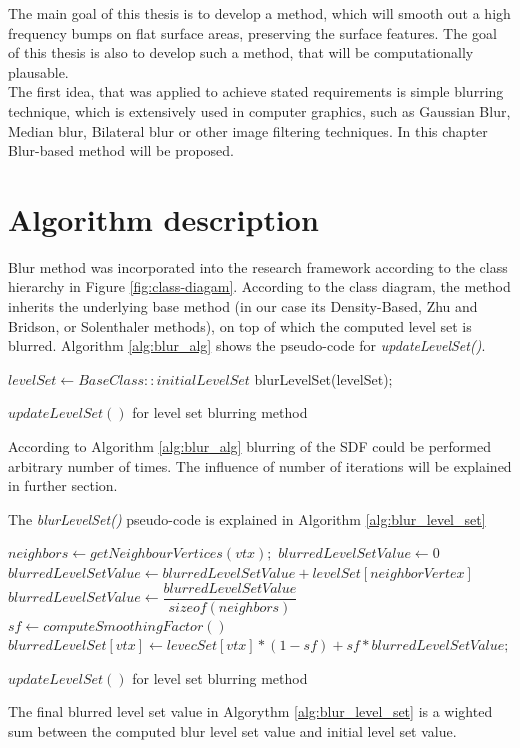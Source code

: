 The main goal of this thesis is to develop a method, which will smooth out a high frequency bumps on flat surface areas, preserving the surface features. The goal of this thesis is also to develop such a method, that will be computationally plausable.\\
The first idea, that was applied to achieve stated requirements is simple blurring technique, which is extensively used in computer graphics, such as Gaussian Blur, Median blur, Bilateral blur or other image filtering techniques. In this chapter Blur-based method will be proposed. 
\section{Algorithm description}
Blur method was incorporated into the research framework according to the class hierarchy in Figure \ref{fig:class-diagam}. According to the class diagram, the method inherits the underlying base method (in our case its Density-Based, Zhu and Bridson, or Solenthaler methods), on top of which the computed level set is blurred.  Algorithm \ref{alg:blur_alg} shows the pseudo-code for \emph{updateLevelSet()}.
\begin{algorithm}[H]
	\scriptsize
	\begin{algorithmic}
		\State $levelSet \gets  BaseClass::initialLevelSet$
			\State blurLevelSet(levelSet);
		\EndFor
	\end{algorithmic}
	\caption{$updateLevelSet()$ for level set blurring method}
	\label{alg:blur_alg}
\end{algorithm}
According to Algorithm \ref{alg:blur_alg} blurring of the SDF could be performed arbitrary number of times. The influence of number of iterations will be explained in further section.

The \emph{blurLevelSet()} pseudo-code is explained in Algorithm \ref{alg:blur_level_set}
\begin{algorithm}[H]
	\scriptsize
	\begin{algorithmic}
		\ForAll{$vtx \in MC\_CellDomain$}
			\State $neighbors \gets getNeighbourVertices(vtx);$
			\State $blurredLevelSetValue \gets 0$
			\ForAll{$nbVtx \in neighbors$}
				\State $blurredLevelSetValue\gets blurredLevelSetValue + levelSet[neighborVertex]$
			\EndFor
			\State $blurredLevelSetValue\gets\dfrac{blurredLevelSetValue}{sizeof(neighbors)}$
			\State $sf\gets computeSmoothingFactor()$
			\State $blurredLevelSet[vtx]\gets levecSet[vtx] * (1 - sf) + sf * blurredLevelSetValue;$
		\EndFor
	\end{algorithmic}
	\caption{$updateLevelSet()$ for level set blurring method}
	\label{alg:blur_level_set}
\end{algorithm}
The final blurred level set value in Algorythm \ref{alg:blur_level_set} is a wighted sum between the computed blur level set value and initial level set value.
